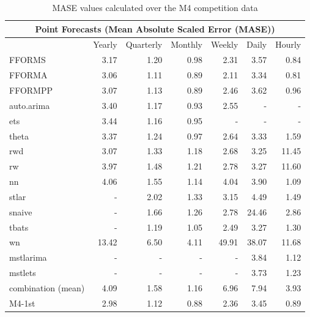 \documentclass{monashthesis}
\begin{document}
\begin{table}[!h]
\centering\scriptsize\tabcolsep=0.12cm
\caption{MASE values calculated over the M4 competition data}
\label{forecastsconcl}
\begin{tabular}{l|rrrrrr}
\hline
\multicolumn{7}{c}{Point Forecasts (Mean Absolute Scaled Error (MASE))} \\\hline
 & Yearly & Quarterly & Monthly & Weekly & Daily & Hourly \\\hline
FFORMS & 3.17 &  1.20 &  0.98&  2.31& 3.57 &  0.84\\
FFORMA & 3.06 & 1.11 &  0.89& 2.11 & 3.34 & 0.81\\
FFORMPP & 3.07 & 1.13 &  0.89& 2.46 & 3.62 & 0.96\\\hline
auto.arima & 3.40 &1.17  &0.93  & 2.55 &  -& - \\
ets & 3.44 &  1.16& 0.95 &  -&-  &  -\\
theta & 3.37 &1.24  & 0.97 &2.64  & 3.33 & 1.59 \\
rwd & 3.07 & 1.33 & 1.18  & 2.68  & 3.25 & 11.45 \\
rw & 3.97 & 1.48 & 1.21  &2.78  & 3.27 & 11.60 \\
nn & 4.06 & 1.55 &  1.14 &4.04 & 3.90 & 1.09 \\
stlar & - & 2.02 &  1.33& 3.15 & 4.49 & 1.49 \\
snaive & - &  1.66& 1.26 &  2.78& 24.46 & 2.86 \\
tbats & - & 1.19 &  1.05& 2.49 & 3.27 &  1.30\\
wn & 13.42 &  6.50&  4.11&  49.91& 38.07 & 11.68 \\
mstlarima & - & - &  - & - & 3.84 &  1.12\\
mstlets & - &  - &  - &  - & 3.73 &  1.23\\
combination (mean) & 4.09 & 1.58 &  1.16&6.96  & 7.94 & 3.93 \\\hline
M4-1st & 2.98 & 1.12 &  0.88& 2.36 & 3.45 & 0.89\\\hline
\end{tabular}
\end{table}
\end{document}
